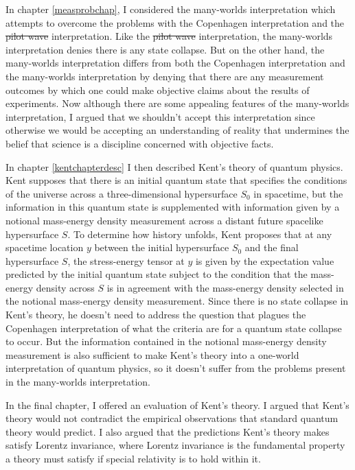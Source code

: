 \documentclass[12pt]{report}
\providecommand{\DIFadd}[1]{{\protect\color{blue}\uwave{#1}}} %
\providecommand{\DIFdel}[1]{{\protect\color{red}\sout{#1}}}                      %
\providecommand{\DIFaddbegin}{} %
\providecommand{\DIFaddend}{} %
\providecommand{\DIFdelbegin}{} %
\providecommand{\DIFdelend}{} %
\begin{document}
In chapter \ref{measprobchap}, I considered the many-worlds interpretation which attempts to overcome the problems with the Copenhagen interpretation and the \DIFdelbegin \DIFdel{pilot wave }\DIFdelend \DIFaddbegin \DIFadd{Bohmian }\DIFaddend interpretation. Like the \DIFdelbegin \DIFdel{pilot wave }\DIFdelend \DIFaddbegin \DIFadd{Bohmian }\DIFaddend interpretation, the many-worlds interpretation denies there is any state collapse. But on the other hand, the many-worlds interpretation differs from both the Copenhagen interpretation and the many-worlds interpretation by denying that there are any measurement outcomes by which one could make objective claims about the results of experiments. Now although there are some appealing features of the many-worlds interpretation, I argued that we shouldn't accept this interpretation since otherwise we would be accepting an understanding of reality that undermines the belief that science is a discipline concerned with objective facts. 

In chapter \ref{kentchapterdesc} I then described Kent's theory of quantum physics. Kent supposes that there is an initial quantum state that specifies the conditions of the universe across a three-dimensional hypersurface $S_0$ in spacetime, but the information in this quantum state is supplemented with information given by a notional mass-energy density measurement across a distant future spacelike hypersurface $S$. To determine how history unfolds, Kent proposes that at any spacetime location $y$ between the initial hypersurface $S_0$ and the final hypersurface $S$, the stress-energy tensor at $y$ is given by the expectation value predicted by the initial quantum state subject to the condition that the mass-energy density across $S$ is in agreement with the mass-energy density selected in the notional mass-energy density measurement. Since there is no state collapse in Kent's theory, he doesn't need to address the question that plagues the Copenhagen interpretation of what the criteria are for a quantum state collapse to occur. But the information contained in the notional mass-energy density measurement is also sufficient to make Kent's theory into a one-world interpretation of quantum physics, so it doesn't suffer from the problems present in the many-worlds interpretation. 

In the final chapter, I offered an evaluation of Kent's theory. I argued that Kent's theory would not contradict the empirical observations that standard quantum theory would predict. I also argued that the predictions Kent's theory makes satisfy Lorentz invariance, where Lorentz invariance is the fundamental property a theory must satisfy if special relativity is to hold within it. 
\end{document}
